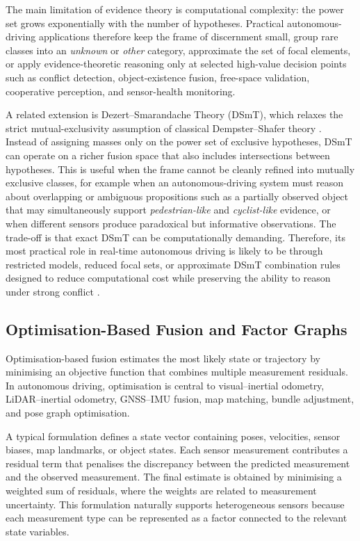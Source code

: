 \documentclass{ieeeaccess}
\begin{document}
\smallskip
The main limitation of evidence theory is computational complexity: the power set grows exponentially with the number of hypotheses. Practical autonomous-driving applications therefore keep the frame of discernment small, group rare classes into an \emph{unknown} or \emph{other} category, approximate the set of focal elements, or apply evidence-theoretic reasoning only at selected high-value decision points such as conflict detection, object-existence fusion, free-space validation, cooperative perception, and sensor-health monitoring.

A related extension is Dezert--Smarandache Theory (DSmT), which relaxes the strict mutual-exclusivity assumption of classical Dempster--Shafer theory \cite{smarandache_intro_dsmt_2009}. Instead of assigning masses only on the power set of exclusive hypotheses, DSmT can operate on a richer fusion space that also includes intersections between hypotheses. This is useful when the frame cannot be cleanly refined into mutually exclusive classes, for example when an autonomous-driving system must reason about overlapping or ambiguous propositions such as a partially observed object that may simultaneously support \emph{pedestrian-like} and \emph{cyclist-like} evidence, or when different sensors produce paradoxical but informative observations. The trade-off is that exact DSmT can be computationally demanding. Therefore, its most practical role in real-time autonomous driving is likely to be through restricted models, reduced focal sets, or approximate DSmT combination rules designed to reduce computational cost while preserving the ability to reason under strong conflict \cite{guo_evidenceclustering_2015}.
\subsection{Optimisation-Based Fusion and Factor Graphs}

Optimisation-based fusion estimates the most likely state or trajectory by minimising an objective function that combines multiple measurement residuals. In autonomous driving, optimisation is central to visual--inertial odometry, LiDAR--inertial odometry, GNSS--IMU fusion, map matching, bundle adjustment, and pose graph optimisation.

A typical formulation defines a state vector containing poses, velocities, sensor biases, map landmarks, or object states. Each sensor measurement contributes a residual term that penalises the discrepancy between the predicted measurement and the observed measurement. The final estimate is obtained by minimising a weighted sum of residuals, where the weights are related to measurement uncertainty. This formulation naturally supports heterogeneous sensors because each measurement type can be represented as a factor connected to the relevant state variables.
\end{document}
